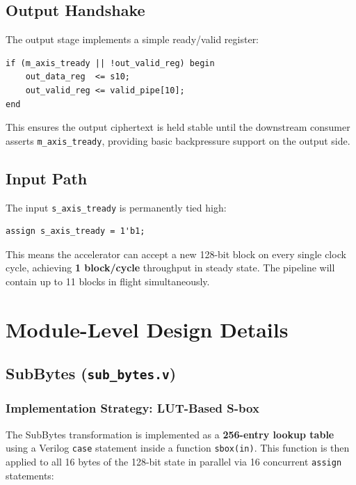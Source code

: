 \documentclass[12pt,a4paper]{article}
\begin{document}
\subsection{Output Handshake}

The output stage implements a simple ready/valid register:

\begin{lstlisting}[caption={AXI-Stream output register with backpressure}]
if (m_axis_tready || !out_valid_reg) begin
    out_data_reg  <= s10;
    out_valid_reg <= valid_pipe[10];
end
\end{lstlisting}

This ensures the output ciphertext is held stable until the downstream
consumer asserts \texttt{m\_axis\_tready}, providing basic backpressure
support on the output side.

\subsection{Input Path}

The input \texttt{s\_axis\_tready} is permanently tied high:
\begin{lstlisting}
assign s_axis_tready = 1'b1;
\end{lstlisting}

This means the accelerator can accept a new 128-bit block on every single
clock cycle, achieving \textbf{1 block/cycle} throughput in steady state.
The pipeline will contain up to 11 blocks in flight simultaneously.

\section{Module-Level Design Details}

\subsection{SubBytes (\texttt{sub\_bytes.v})}

\subsubsection{Implementation Strategy: LUT-Based S-box}

The SubBytes transformation is implemented as a \textbf{256-entry lookup
table} using a Verilog \texttt{case} statement inside a function
\texttt{sbox(in)}. This function is then applied to all 16 bytes of the
128-bit state in parallel via 16 concurrent \texttt{assign} statements:
\end{document}
